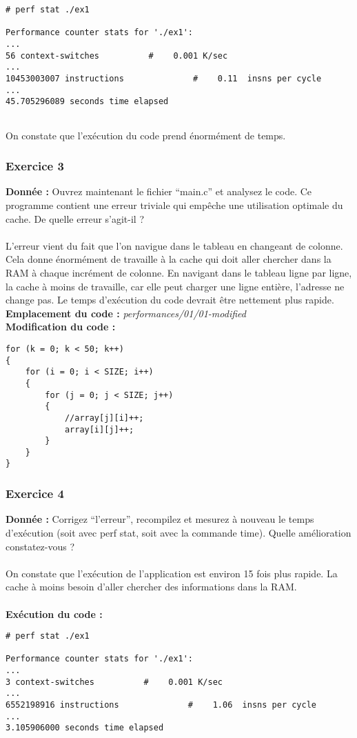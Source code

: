 \begin{lstlisting}
# perf stat ./ex1 

Performance counter stats for './ex1':
...        
56 context-switches          #    0.001 K/sec                  
... 
10453003007 instructions              #    0.11  insns per cycle        
...
45.705296089 seconds time elapsed


\end{lstlisting}
On constate que l'exécution du code prend énormément de temps.

\subsubsection{Exercice 3}
\textbf{Donnée : } Ouvrez	maintenant	le	fichier	“main.c”	et	analysez	le	code.
Ce	programme	contient	une	erreur	triviale	qui	empêche	une	utilisation	optimale	du	cache.	De	quelle	
erreur	s'agit-il	?\\\\
L'erreur vient du fait que l'on navigue dans le tableau en changeant de colonne. Cela donne énormément de travaille à la cache qui doit aller chercher dans la RAM à chaque incrément de colonne.
En navigant dans le tableau ligne par ligne, la cache à moins de travaille, car elle peut charger une ligne entière, l'adresse ne change pas. Le temps d'exécution du code devrait être nettement plus rapide.\\

\textbf{Emplacement du code : }\textit{performances/01/01-modified}\\

\textbf{Modification du code : } \\
\begin{lstlisting}
for (k = 0; k < 50; k++)
{
	for (i = 0; i < SIZE; i++)
	{
		for (j = 0; j < SIZE; j++)
		{
			//array[j][i]++;
			array[i][j]++;
		}
	}
}
\end{lstlisting}

\subsubsection{Exercice 4}
\textbf{Donnée : } Corrigez	“l'erreur”,	recompilez	et	mesurez	à	nouveau	le	temps	d'exécution	(soit	avec	perf	stat,	soit	
avec	la	commande	time).	Quelle	amélioration	constatez-vous	?\\\\
On constate que l'exécution de l'application est environ 15 fois plus rapide. La cache à moins besoin d'aller chercher des informations dans la RAM.\\\\
\textbf{Exécution du code : } \\
\begin{lstlisting}
# perf stat ./ex1 

Performance counter stats for './ex1':
...      
3 context-switches          #    0.001 K/sec                  
...  
6552198916 instructions              #    1.06  insns per cycle        
...
3.105906000 seconds time elapsed

\end{lstlisting}


